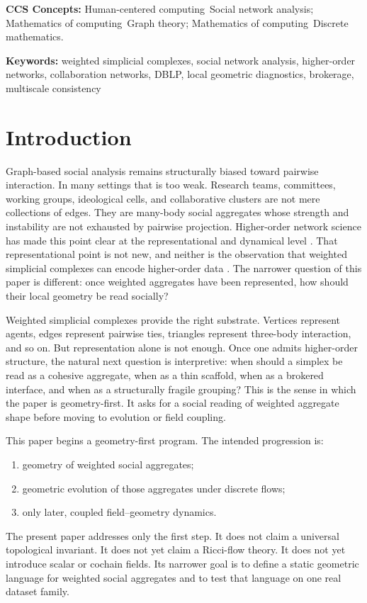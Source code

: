 \documentclass[11pt]{article}
\newcommand{\keywords}[1]{\par\medskip\noindent\textbf{Keywords:} #1\par\medskip}
\begin{document}
\noindent\textbf{CCS Concepts:} Human-centered computing~Social network analysis; Mathematics of computing~Graph theory; Mathematics of computing~Discrete mathematics.

\keywords{
weighted simplicial complexes,
social network analysis,
higher-order networks,
collaboration networks,
DBLP,
local geometric diagnostics,
brokerage,
multiscale consistency
}

\section{Introduction}

Graph-based social analysis remains structurally biased toward pairwise interaction. In many settings that is too weak. Research teams, committees, working groups, ideological cells, and collaborative clusters are not mere collections of edges. They are many-body social aggregates whose strength and instability are not exhausted by pairwise projection. Higher-order network science has made this point clear at the representational and dynamical level \cite{BensonGleichLeskovec2016,IacopiniPetriBarratLatora2019,BattistonCencettiIacopiniEtAl2020,BickGrossHarringtonSchaub2023}. That representational point is not new, and neither is the observation that weighted simplicial complexes can encode higher-order data \cite{BacciniGeraciBianconi2022}. The narrower question of this paper is different: once weighted aggregates have been represented, how should their local geometry be read socially?

Weighted simplicial complexes provide the right substrate. Vertices represent agents, edges represent pairwise ties, triangles represent three-body interaction, and so on. But representation alone is not enough. Once one admits higher-order structure, the natural next question is interpretive: when should a simplex be read as a cohesive aggregate, when as a thin scaffold, when as a brokered interface, and when as a structurally fragile grouping? This is the sense in which the paper is geometry-first. It asks for a social reading of weighted aggregate shape before moving to evolution or field coupling.

This paper begins a geometry-first program. The intended progression is:
\begin{enumerate}[label=(\arabic*)]
    \item geometry of weighted social aggregates;
    \item geometric evolution of those aggregates under discrete flows;
    \item only later, coupled field--geometry dynamics.
\end{enumerate}
The present paper addresses only the first step. It does not claim a universal topological invariant. It does not yet claim a Ricci-flow theory. It does not yet introduce scalar or cochain fields. Its narrower goal is to define a static geometric language for weighted social aggregates and to test that language on one real dataset family.
\end{document}
